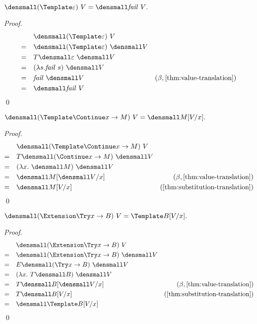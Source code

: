 \begin{lemma}
  \label{thm:templ-fail}
  $ \den{(\Template \varepsilon) ~ V} = \den{\mathit{fail}~V}.$
\end{lemma}
    \begin{proof}
        \begin{align*}
            &\quad \den{(\Template \varepsilon) ~ V} \\
            =& \quad \den{(\Template \varepsilon)} ~ \den{V}\\
            =& \quad T\den{\varepsilon} ~ \den{V} \\
            =& \quad (\lambda s. \mathit{fail} ~ s) ~ \den{V} \\
            =& \quad \mathit{fail} ~ \den{V} &(\beta, \cref{thm:value-translation}) \\
            =& \quad \den{\mathit{fail} ~ V}
        \end{align*}
        \qed
    \end{proof}

\begin{lemma}
  \label{thm:templ-continue}
  
  $ \den{(\Template \Continue x \to M) ~ V} = \den{M\subst{x}{V}}.$
\end{lemma}
\begin{proof}
  \begin{align*}
    &\quad \den{(\Template \Continue x \to M) ~ V} \\
    =& \quad T\den{(\Continue x \to M)} ~ \den{V}\\
    =& \quad (\lambda x. ~\den{M}) ~ \den{V} \\
    =& \quad \den{M}\subst{x}{\den{V}} & (\beta, \cref{thm:value-translation}) \\
    =& \quad \den{M\subst{x}{V}} &(\cref{thm:substitution-translation})
  \end{align*}
  \qed
\end{proof}

\begin{lemma}
  \label{thm:ext-try}
  
  $ \den{(\Extension \Try x \to B) ~ V} = \Template B\subst{x}{V}.$
\end{lemma}
\begin{proof}
  \begin{align*}
    &\quad \den{(\Extension \Try x \to B) ~ V}  \\
    =& \quad \den{(\Extension \Try x \to B)} ~ \den{V}\\
    =& \quad E\den{(\Try x \to B)} ~ \den{V}\\
    =& \quad (\lambda x. ~T\den{B}) ~ \den{V}\\
    =& \quad T\den{B}\subst{x}{\den{V}} &(\beta, \cref{thm:value-translation}) \\
    =& \quad T\den{B\subst{x}{V}} &(\cref{thm:substitution-translation}) \\
    =& \quad \den{\Template B\subst{x}{V}}
  \end{align*}
  \qed
\end{proof}

